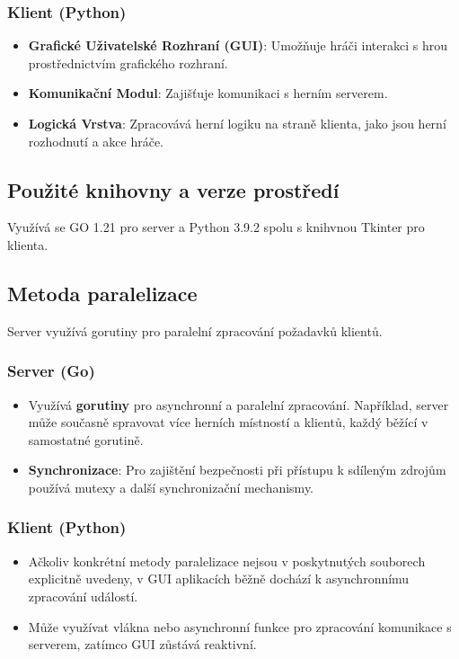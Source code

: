 \documentclass{article}
\begin{document}
\subsubsection{Klient (Python)}
\begin{itemize}
  \item \textbf{Grafické Uživatelské Rozhraní (GUI)}: Umožňuje hráči interakci s hrou prostřednictvím grafického rozhraní.
  \item \textbf{Komunikační Modul}: Zajišťuje komunikaci s herním serverem.
  \item \textbf{Logická Vrstva}: Zpracovává herní logiku na straně klienta, jako jsou herní rozhodnutí a akce hráče.
\end{itemize}

\subsection{Použité knihovny a verze prostředí}
Využívá se GO 1.21 pro server a Python 3.9.2 spolu s knihvnou Tkinter pro klienta.

\subsection{Metoda paralelizace}
Server využívá gorutiny pro paralelní zpracování požadavků klientů.

\subsubsection{Server (Go)}
\begin{itemize}
  \item Využívá \textbf{gorutiny} pro asynchronní a paralelní zpracování. Například, server může současně spravovat více herních místností a klientů, každý běžící v samostatné gorutině.
  \item \textbf{Synchronizace}: Pro zajištění bezpečnosti při přístupu k sdíleným zdrojům používá mutexy a další synchronizační mechanismy.
\end{itemize}

\subsubsection{Klient (Python)}
\begin{itemize}
  \item Ačkoliv konkrétní metody paralelizace nejsou v poskytnutých souborech explicitně uvedeny, v GUI aplikacích běžně dochází k asynchronnímu zpracování událostí. 
  \item Může využívat vlákna nebo asynchronní funkce pro zpracování komunikace s serverem, zatímco GUI zůstává reaktivní.
\end{itemize}
\end{document}
